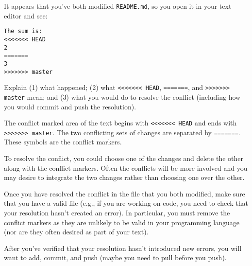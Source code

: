 \documentclass[10pt]{examdesign}
\begin{document}
\begin{shortanswer}[title={Longer Answer (5 pts each)},
                    rearrange=no,resetcounter=no]
\begin{block}[questions=2]
\begin{question}
  It appears that you've both modified \texttt{README.md}, so you open
  it in your text editor and see:

  \texttt{The sum is: \\
    <<<<<<< HEAD \\ 
    2 \\
    ======= \\
    3 \\
    >>>>>>> master \\
  }

  Explain (1) what happened; (2) what \texttt{<<<<<<< HEAD}, \texttt{=======},
  and \texttt{>>>>>>> master} mean; and (3) what you would do to resolve
  the conflict (including how you would commit and push the resolution).
  \vspace{50mm}
  \begin{answer}
    The conflict marked area of the text begins with \texttt{<<<<<<< HEAD}
    and ends with \texttt{>>>>>>> master}.  The two conflicting sets of
    changes are separated by \texttt{=======}.  These symbols are the
    conflict markers.

    To resolve the conflict, you could choose one of the changes and delete
    the other along with the conflict markers.  Often the conflicts will be
    more involved and you may desire to integrate the two changes rather
    than choosing one over the other.

    Once you have resolved the conflict in the file that you both modified,
    make sure that you have a valid file (e.g., if you are working on code,
    you need to check that your resolution hasn't created an error).  In
    particular, you must remove the conflict markers as they are unlikely
    to be valid in your programming language (nor are they often desired
    as part of your text).

    After you've verified that your resolution hasn't introduced new errors,
    you will want to add, commit, and push (maybe you need to pull before
    you push).
  \end{answer}
\end{question}

\end{block}


\end{shortanswer}
\end{document}
